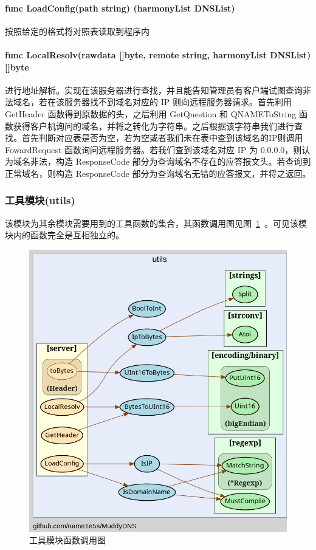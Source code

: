 \documentclass[blue,normal,cn]{elegantnote}
\begin{document}
\paragraph{func LoadConfig(path string) (harmonyList DNSList)} 按照给定的格式将对照表读取到程序内

\paragraph{func LocalResolv(rawdata []byte, remote string, harmonyList DNSList) []byte} 进行地址解析。实现在该服务器进行查找，并且能告知管理员有客户端试图查询非法域名，若在该服务器找不到域名对应的 IP 则向远程服务器请求。首先利用 GetHeader 函数得到原数据的头，之后利用 GetQuestion 和 QNAMEToString 函数获得客户机询问的域名，并将之转化为字符串。之后根据该字符串我们进行查找。首先判断对应表是否为空，若为空或者我们未在表中查到该域名的IP则调用 FowardRequest 函数询问远程服务器。若我们查到该域名对应 IP 为 0.0.0.0，则认为域名非法，构造 ResponseCode 部分为查询域名不存在的应答报文头。若查询到正常域名，则构造 ResponseCode 部分为查询域名无错的应答报文，并将之返回。

\subsubsection{工具模块(utils)}
该模块为其余模块需要用到的工具函数的集合，其函数调用图见图~\ref{call_utils}~。可见该模块内的函数完全是互相独立的。

\begin{figure}[!htbp]
	\centering
	\includegraphics[width=.9\textwidth]{call_utils.png}
	\caption{工具模块函数调用图}
	\label{call_utils}
\end{figure}
\end{document}
